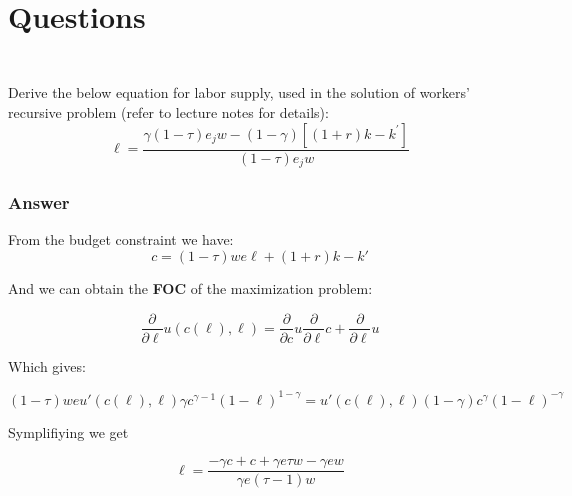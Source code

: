 \documentclass[10pt,notitlepage,onecolumn,aps,pra]{revtex4-1}
\begin{document}
    \begin{Verbatim}[commandchars=\\\{\}]


    \end{Verbatim}

    \begin{center}
    \end{center}
    { \hspace*{\fill} \\}
    
    \hypertarget{questions}{%
\section{Questions}\label{questions}}

    \hypertarget{quad}{%
\subsection{\texorpdfstring{\(\quad\)}{\textbackslash quad}}\label{quad}}

Derive the below equation for labor supply, used in the solution of
workers' recursive problem (refer to lecture notes for details): \[
\ell=\frac{\gamma(1-\tau) e_{j} w-(1-\gamma)\left[(1+r) k-k^{\prime}\right]}{(1-\tau) e_{j} w}
\]

    \hypertarget{answer}{%
\subsubsection{Answer}\label{answer}}

From the budget constraint we have: \begin{equation}\label{eq:c}
    c=(1-\tau) w e \ell+(1+r) k- k'
\end{equation}

And we can obtain the \textbf{FOC} of the maximization problem:

\[\frac{\partial}{\partial \ell} u(c(\ell),\ell) = \frac{\partial}{\partial c} u \frac{\partial}{\partial \ell} c +\frac{\partial}{\partial \ell} u\]

Which gives:

\[(1-\tau) w e u'(c(\ell),\ell) \gamma c^{\gamma-1}\left(1-\ell\right)^{1-\gamma} =  u'(c(\ell),\ell)(1- \gamma) c^{\gamma}\left(1-\ell\right)^{-\gamma} \]

Symplifiying we get

\begin{equation}\label{eq:l_first}
\ell =\frac{-\gamma  c+c+\gamma  e \tau  w-\gamma e w}{\gamma  e (\tau -1) w} 
\end{equation}
\end{document}
